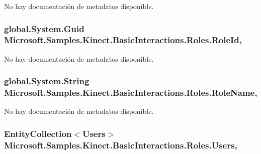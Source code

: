 No hay documentación de metadatos disponible. 

\hypertarget{class_microsoft_1_1_samples_1_1_kinect_1_1_basic_interactions_1_1_roles_a270cc1c389f0efc5f0c8305f867b5e42}{
\subsubsection[{Role\-Id}]{\setlength{\rightskip}{0pt plus 5cm}global.\-System.\-Guid Microsoft.\-Samples.\-Kinect.\-Basic\-Interactions.\-Roles.\-Role\-Id\hspace{0.3cm}{\ttfamily [get]}, {\ttfamily [set]}}}\label{class_microsoft_1_1_samples_1_1_kinect_1_1_basic_interactions_1_1_roles_a270cc1c389f0efc5f0c8305f867b5e42}


No hay documentación de metadatos disponible. 

\hypertarget{class_microsoft_1_1_samples_1_1_kinect_1_1_basic_interactions_1_1_roles_ac8cc9e5363c7768b8ef19319bb76e8f3}{
\subsubsection[{Role\-Name}]{\setlength{\rightskip}{0pt plus 5cm}global.\-System.\-String Microsoft.\-Samples.\-Kinect.\-Basic\-Interactions.\-Roles.\-Role\-Name\hspace{0.3cm}{\ttfamily [get]}, {\ttfamily [set]}}}\label{class_microsoft_1_1_samples_1_1_kinect_1_1_basic_interactions_1_1_roles_ac8cc9e5363c7768b8ef19319bb76e8f3}


No hay documentación de metadatos disponible. 

\hypertarget{class_microsoft_1_1_samples_1_1_kinect_1_1_basic_interactions_1_1_roles_a2a10cc078afa88cd31b6edc20610b97a}{
\subsubsection[{Users}]{\setlength{\rightskip}{0pt plus 5cm}Entity\-Collection$<${\bf Users}$>$ Microsoft.\-Samples.\-Kinect.\-Basic\-Interactions.\-Roles.\-Users\hspace{0.3cm}{\ttfamily [get]}, {\ttfamily [set]}}}\label{class_microsoft_1_1_samples_1_1_kinect_1_1_basic_interactions_1_1_roles_a2a10cc078afa88cd31b6edc20610b97a}


